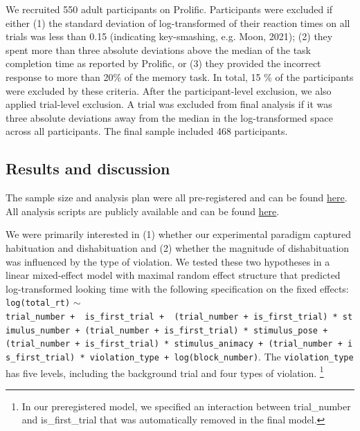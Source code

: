 \documentclass[10pt, letterpaper]{article}
\begin{document}
We recruited 550 adult participants on Prolific. Participants were
excluded if either (1) the standard deviation of log-transformed of
their reaction times on all trials was less than 0.15 (indicating
key-smashing, e.g. Moon, 2021); (2) they spent more than three absolute
deviations above the median of the task completion time as reported by
Prolific, or (3) they provided the incorrect response to more than 20\%
of the memory task. In total, 15 \% of the participants were excluded by
these criteria. After the participant-level exclusion, we also applied
trial-level exclusion. A trial was excluded from final analysis if it
was three absolute deviations away from the median in the
log-transformed space across all participants. The final sample included
468 participants.

\hypertarget{results-and-discussion}{%
\subsection{Results and discussion}\label{results-and-discussion}}

The sample size and analysis plan were all pre-registered and can be
found \href{https://aspredicted.org/blind.php?x=WGF_J7K}{here}. All
analysis scripts are publicly available and can be found
\href{https://anonymous.4open.science/r/pokebaby_cogsci2024-3636/README.md}{here}.

We were primarily interested in (1) whether our experimental paradigm
captured habituation and dishabituation and (2) whether the magnitude of
dishabituation was influenced by the type of violation. We tested these
two hypotheses in a linear mixed-effect model with maximal random effect
structure that predicted log-transformed looking time with the following
specification on the fixed effects: \texttt{log(total\_rt)} \(\sim\)
\texttt{trial\_number\ +\ \ is\_first\_trial\ +\ \ (trial\_number\ +\ is\_first\_trial)\ *\ stimulus\_number\ +\ (trial\_number\ +\ is\_first\_trial)\ *\ stimulus\_pose\ +(trial\_number\ +\ is\_first\_trial)\ *\ stimulus\_animacy\ +\ (trial\_number\ +\ is\_first\_trial)\ *\ violation\_type\ +\ log(block\_number)}.
The \texttt{violation\_type} has five levels, including the background
trial and four types of violation. \footnote{In our preregistered model,
  we specified an interaction between trial\_number and is\_first\_trial
  that was automatically removed in the final model.}
\end{document}
